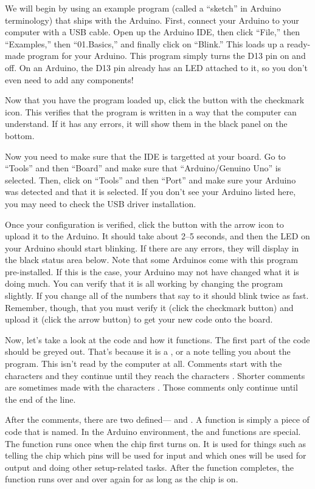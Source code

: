 We will begin by using an example program (called a ``sketch'' in Arduino terminology) that ships with the Arduino.
First, connect your Arduino to your computer with a USB cable.
Open up the Arduino IDE, then click ``File,'' then ``Examples,'' then ``01.Basics,'' and finally click on ``Blink.''
This loads up a ready-made program for your Arduino.
This program simply turns the D13 pin on and off.
On an Arduino, the D13 pin already has an LED attached to it, so you don't even need to add any components!

Now that you have the program loaded up, click the button with the checkmark icon.
This verifies that the program is written in a way that the computer can understand.
If it has any errors, it will show them in the black panel on the bottom.

Now you need to make sure that the IDE is targetted at your board.
Go to ``Tools'' and then ``Board'' and make sure that ``Arduino/Genuino Uno'' is selected.
Then, click on ``Tools'' and then ``Port'' and make sure your Arduino was detected and that it is selected.
If you don't see your Arduino listed here, you may need to check the USB driver installation.

Once your configuration is verified, click the button with the arrow icon to upload it to the Arduino.
It should take about 2--5 seconds, and then the LED on your Arduino should start blinking.
If there are any errors, they will display in the black status area below.
Note that some Arduinos come with this program pre-installed.
If this is the case, your Arduino may not have changed what it is doing much.
You can verify that it is all working by changing the program slightly.
If you change all of the numbers that say  to  it should blink twice as fast.
Remember, though, that you must verify it (click the checkmark button) and upload it (click the arrow button) to get your new code onto the board.

Now, let's take a look at the code and how it functions.
The first part of the code should be greyed out.
That's because it is a , or a note telling you about the program.
This isn't read by the computer at all.
Comments start with the characters \icode{/*} and they continue until they reach the characters \icode{*/}.
Shorter comments are sometimes made with the characters \icode{//}.
Those comments only continue until the end of the line.

After the comments, there are two  defined--- and .
A function is simply a piece of code that is named.
In the Arduino environment, the  and  functions are special.
The  function runs once when the chip first turns on.
It is used for things such as telling the chip which pins will be used for input and which ones will be used for output and doing other setup-related tasks.
After the  function completes, the  function runs over and over again for as long as the chip is on.

